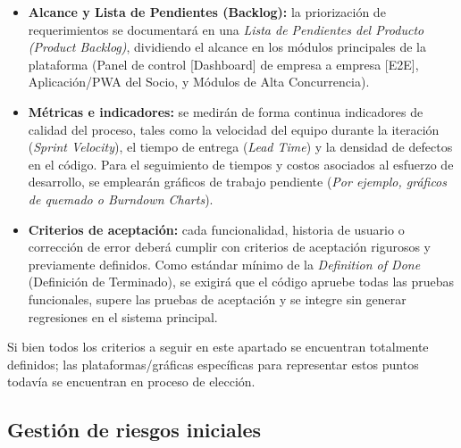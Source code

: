 \begin{itemize}
    \item \textbf{Alcance y Lista de Pendientes (Backlog):} la priorización de requerimientos se documentará en una \textit{Lista de Pendientes del Producto (Product Backlog)}, dividiendo el alcance en los módulos principales de la plataforma (Panel de control [Dashboard] de empresa a empresa [E2E], Aplicación/PWA del Socio, y Módulos de Alta Concurrencia).
    \item \textbf{Métricas e indicadores:} se medirán de forma continua indicadores de calidad del proceso, tales como la velocidad del equipo durante la iteración (\textit{Sprint Velocity}), el tiempo de entrega (\textit{Lead Time}) y la densidad de defectos en el código. Para el seguimiento de tiempos y costos asociados al esfuerzo de desarrollo, se emplearán gráficos de trabajo pendiente (\textit{Por ejemplo, gráficos de quemado o Burndown Charts}).
    \item \textbf{Criterios de aceptación:} cada funcionalidad, historia de usuario o corrección de error deberá cumplir con criterios de aceptación rigurosos y previamente definidos. Como estándar mínimo de la \textit{Definition of Done} (Definición de Terminado), se exigirá que el código apruebe todas las pruebas funcionales, supere las pruebas de aceptación y se integre sin generar regresiones en el sistema principal.
\end{itemize}

Si bien todos los criterios a seguir en este apartado se encuentran totalmente definidos; las plataformas/gráficas específicas para representar estos puntos todavía se encuentran en proceso de elección.

\subsection{Gestión de riesgos iniciales}

